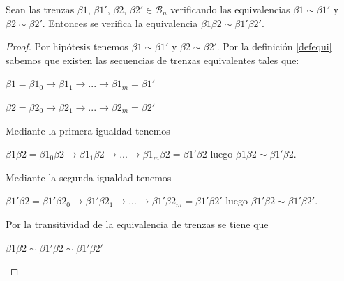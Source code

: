 \begin{pro}\label{prod1}
	Sean las trenzas $\beta1$, $\beta1'$, $\beta2$, $\beta2' \in \mathscr{B}_{n}$ verificando las equivalencias $\beta1 \sim \beta1'$ y $\beta2 \sim \beta2'$. Entonces se verifica la equivalencia $\beta1\beta2 \sim \beta1'\beta2'$.
	\begin{proof}
		Por hipótesis tenemos $\beta1 \sim \beta1'$ y $\beta2 \sim \beta2'$. Por la definición \ref{defequi} sabemos que existen las secuencias de trenzas equivalentes tales que: 
		\begin{center}
			$ \beta1 = \beta1_{0} \rightarrow \beta1_{1} \rightarrow ... \rightarrow \beta1_{m}=\beta1'$ 
		\end{center}
		\begin{center}
			$ \beta2 = \beta2_{0} \rightarrow \beta2_{1} \rightarrow ... \rightarrow \beta2_{m}=\beta2'$ 
		\end{center}
		Mediante la primera igualdad tenemos 
		\begin{center}
			$ \beta1\beta2 = \beta1_{0}\beta2 \rightarrow \beta1_{1}\beta2 \rightarrow ... \rightarrow \beta1_{m}\beta2=\beta1'\beta2$ luego $ \beta1\beta2 \sim \beta1'\beta2$.
		\end{center}
		Mediante la segunda igualdad tenemos
		\begin{center}
			$ \beta1'\beta2 = \beta1'\beta2_{0} \rightarrow \beta1'\beta2_{1} \rightarrow ... \rightarrow \beta1'\beta2_{m}=\beta1'\beta2'$ 
			luego $ \beta1'\beta2 \sim \beta1'\beta2'$.
		\end{center}
		Por la transitividad de la equivalencia de trenzas se tiene que
\begin{center}
			 $  \beta1\beta2 \sim \beta1'\beta2 \sim \beta1'\beta2'$	
\end{center}	
				
	\end{proof}
\end{pro}

